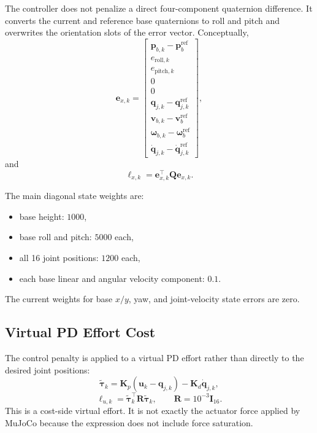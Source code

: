 \documentclass[11pt,a4paper]{article}
\begin{document}
The controller does not penalize a direct four-component quaternion
difference. It converts the current and reference base quaternions to roll and
pitch and overwrites the orientation slots of the error vector. Conceptually,
\begin{equation}
  \bm{e}_{x,k}=
  \begin{bmatrix}
    \bm{p}_{b,k}-\bm{p}^{\mathrm{ref}}_b\\
    e_{\mathrm{roll},k}\\
    e_{\mathrm{pitch},k}\\
    0\\
    0\\
    \bm{q}_{j,k}-\bm{q}^{\mathrm{ref}}_{j,k}\\
    \bm{v}_{b,k}-\bm{v}^{\mathrm{ref}}_b\\
    \bm{\omega}_{b,k}-\bm{\omega}^{\mathrm{ref}}_b\\
    \dot{\bm{q}}_{j,k}-\dot{\bm{q}}^{\mathrm{ref}}_{j,k}
  \end{bmatrix},
\end{equation}
and
\begin{equation}
  \ell_{x,k}=\bm{e}_{x,k}^{\top}\bm{Q}\bm{e}_{x,k}.
\end{equation}

The main diagonal state weights are:
\begin{itemize}
  \item base height: $1000$,
  \item base roll and pitch: $5000$ each,
  \item all 16 joint positions: $1200$ each,
  \item each base linear and angular velocity component: $0.1$.
\end{itemize}
The current weights for base $x/y$, yaw, and joint-velocity state errors are
zero.

\subsection{Virtual PD Effort Cost}

The control penalty is applied to a virtual PD effort rather than directly to
the desired joint positions:
\begin{equation}
  \tilde{\bm{\tau}}_k=
  \bm{K}_p(\bm{u}_k-\bm{q}_{j,k})
  -\bm{K}_d
  \dot{\bm{q}}_{j,k},
\end{equation}
\begin{equation}
  \ell_{u,k}=
  \tilde{\bm{\tau}}_k^\top\bm{R}\tilde{\bm{\tau}}_k,
  \qquad
  \bm{R}=10^{-3}\bm{I}_{16}.
\end{equation}
This is a cost-side virtual effort. It is not exactly the actuator force
applied by MuJoCo because the expression does not include force saturation.
\end{document}
